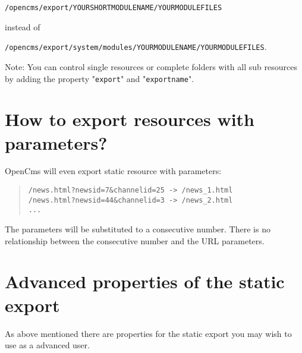 \texttt{/opencms/export/YOURSHORTMODULENAME/YOURMODULEFILES}

instead of

\texttt{/opencms/export/system/modules/YOURMODULENAME/YOURMODULEFILES}.

Note: You can control single resources or complete folders with all sub resources by adding the property "\texttt{export}" and "\texttt{exportname}".

\section{How to export resources with parameters?}

OpenCms will even export static resource with parameters:

\begin{quote}
\begin{verbatim}
/news.html?newsid=7&channelid=25 -> /news_1.html
/news.html?newsid=44&channelid=3 -> /news_2.html
...
\end{verbatim}
\end{quote}

The parameters will be substituted to a consecutive number. There is no relationship between the consecutive number and the URL parameters.

\section{Advanced properties of the static export}

As above mentioned there are properties for the static export you may wish to use as a advanced user. 

